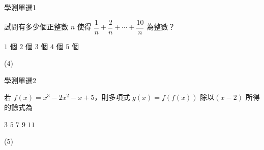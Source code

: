     \begin{QUESTION}
        \begin{ExamInfo}{92}{學測}{單選}{1}
        \end{ExamInfo}
        \begin{ExamAnsRateInfo}{46}{74}{46}{18}
        \end{ExamAnsRateInfo}
        \begin{QBODY}
            試問有多少個正整數 $n$ 使得 $ \dfrac{1}{n} + \dfrac{2}{n} + \cdots + \dfrac{10}{n}$ 為整數？ 
            \begin{QOPS} 
                \QOP $1$ 個 
                \QOP $2$ 個  
                \QOP $3$ 個 
                \QOP $4$ 個 
                \QOP $5$ 個
            \end{QOPS}
        \end{QBODY}
        \begin{QFROMS}
        \end{QFROMS}
        \begin{QTAGS}\end{QTAGS}
        \begin{QANS}
            (4)
        \end{QANS}
        \begin{QSOLLIST}
        \end{QSOLLIST}
        \begin{QEMPTYSPACE}
        \end{QEMPTYSPACE}
    \end{QUESTION}
    \begin{QUESTION}
        \begin{ExamInfo}{92}{學測}{單選}{2}
        \end{ExamInfo}
        \begin{ExamAnsRateInfo}{46}{83}{44}{11}
        \end{ExamAnsRateInfo}
        \begin{QBODY}
            若 $f(x)=x^3 - 2x^2 -x +5$，則多項式 $g(x)=f(f(x))$ 除以$(x-2)$ 所得的餘式為 
            \begin{QOPS} 
                \QOP $3 $
                \QOP $5 $
                \QOP $7 $
                \QOP $9 $
                \QOP $11$
            \end{QOPS}
        \end{QBODY}
        \begin{QFROMS}
        \end{QFROMS}
        \begin{QTAGS}\end{QTAGS}
        \begin{QANS}
            (5)
        \end{QANS}
        \begin{QSOLLIST}
        \end{QSOLLIST}
        \begin{QEMPTYSPACE}
        \end{QEMPTYSPACE}
    \end{QUESTION}
